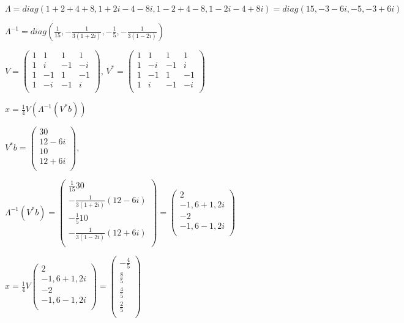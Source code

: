 \documentclass[a4paper,12pt]{article} %
\begin{document}
$\Lambda=diag(1+2+4+8,1+2i-4-8i,1-2+4-8,1-2i-4+8i)=diag(15,-3-6i,-5,-3+6i)$

$\Lambda^{-1}=diag(\frac{1}{15}, -\frac{1}{3(1+2i)}, -\frac{1}{5}, -\frac{1}{3(1-2i)})$

$V=\begin{pmatrix}
1 & 1 & 1 & 1 \\
1 & i & -1 & -i \\
1 & -1 & 1 & -1 \\
1 & -i & -1 & i \\
\end{pmatrix}$, $V^*=\begin{pmatrix}
1 & 1 & 1 & 1 \\
1 & -i & -1 & i \\
1 & -1 & 1 & -1 \\
1 & i & -1 & -i \\
\end{pmatrix}$

$x=\frac{1}{4}V(\Lambda^{-1}(V^{*}b))$

$V^{*}b=\begin{pmatrix}
30  \\
12-6i  \\
10  \\
12+6i  \\
\end{pmatrix}$, 

$\Lambda^{-1}(V^{*}b)=\begin{pmatrix}
\frac{1}{15}30  \\
-\frac{1}{3(1+2i)}(12-6i)  \\
-\frac{1}{5}10  \\
-\frac{1}{3(1-2i)}(12+6i)  \\
\end{pmatrix}
=\begin{pmatrix}
2  \\
-1,6+1,2i  \\
-2  \\
-1,6-1,2i \\
\end{pmatrix}$

$x=\frac{1}{4}V\begin{pmatrix}
2  \\
-1,6+1,2i  \\
-2  \\
-1,6-1,2i \\
\end{pmatrix}=\begin{pmatrix}
-\frac{4}{5}  \\
\frac{8}{5}  \\
\frac{4}{5}  \\
\frac{2}{5} \\
\end{pmatrix}$
\end{document}
